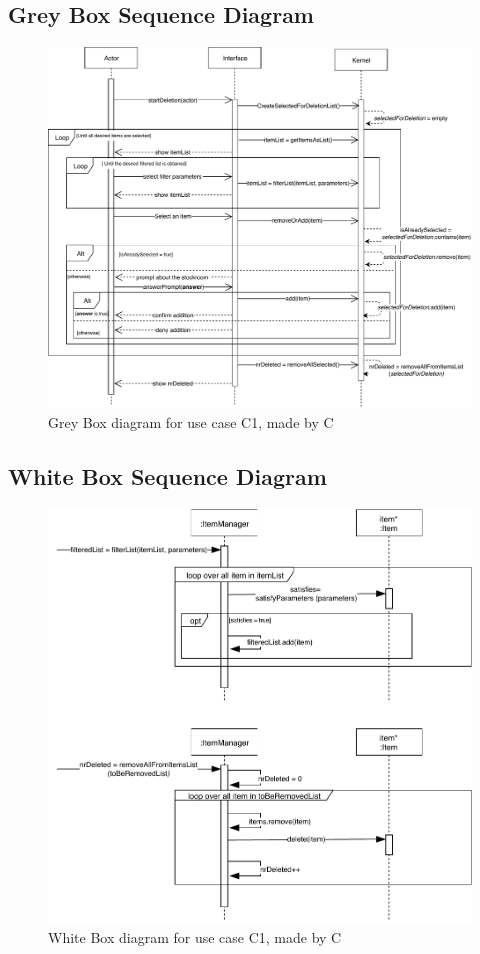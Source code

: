 \subsection*{Grey Box Sequence Diagram}
\begin{figure}[H]
	\centering
	\includegraphics[scale=.9]{uml/SD-gb-delete.pdf}
	\caption*{Grey Box diagram for use case C1, made by C}
\end{figure}
\subsection*{White Box Sequence Diagram}
\begin{figure}[H]
	\centering
	\includegraphics[scale=.85]{uml/SD-wb-delete.pdf}
	\caption*{White Box diagram for use case C1, made by C}
\end{figure}